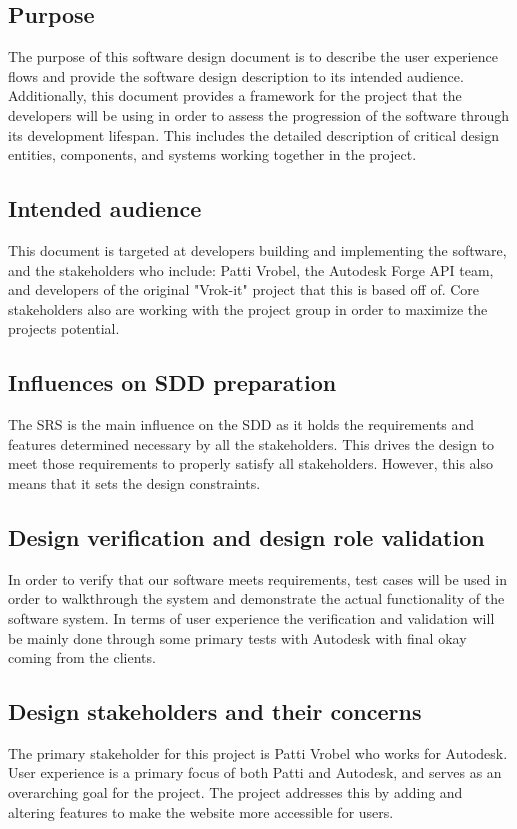 \documentclass[letterpaper, 10pt, draftclsnofoot, compsoc, onecolumn]{IEEEtran}
\begin{document}
\subsection{Purpose}
The purpose of this software design document is to describe the user experience flows and provide the software design description to its intended audience. Additionally, this document provides a framework for the project that the developers will be using in order to assess the progression of the software through its development lifespan. This includes the detailed description of critical design entities, components, and systems working together in the project.
\subsection{Intended audience}
This document is targeted at developers building and implementing the software, and the stakeholders who include: Patti Vrobel, the Autodesk Forge API team,  and developers of the original "Vrok-it" project that this is based off of. Core stakeholders also are working with the project group in order to maximize the projects potential.

\subsection{Influences on SDD preparation}
The SRS is the main influence on the SDD as it holds the requirements and features determined necessary by all the stakeholders. This drives the design to meet those requirements to properly satisfy all stakeholders. However, this also means that it sets the design constraints.

\subsection{Design verification and design role validation}
In order to verify that our software meets requirements, test cases will be used in order to walkthrough the system and demonstrate the actual functionality of the software system. In terms of user experience the verification and validation will be mainly done through some primary tests with Autodesk with final okay coming from the clients.

\subsection{Design stakeholders and their concerns}
	The primary stakeholder for this project is Patti Vrobel who works for Autodesk. User experience is a primary focus of both Patti and Autodesk, and serves as an overarching goal for the project. The project addresses this by adding and altering features to make the website more accessible for users.
\end{document}

